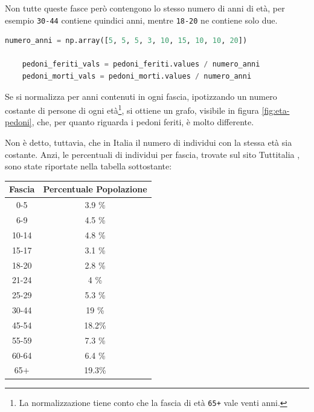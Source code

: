 \documentclass[a4paper]{report}
\newcommand{\columnstyle}[1]{\texttt{#1}}
\begin{document}
Non tutte queste fasce però contengono lo stesso numero di anni di età, per esempio 
\columnstyle{30-44} contiene quindici anni, mentre \columnstyle{18-20} ne contiene solo due.

\begin{lstlisting}[language=Python]
    numero_anni = np.array([5, 5, 5, 3, 10, 15, 10, 10, 20])

    pedoni_feriti_vals = pedoni_feriti.values / numero_anni
    pedoni_morti_vals = pedoni_morti.values / numero_anni
\end{lstlisting}

Se si normalizza per anni contenuti in ogni fascia, ipotizzando un numero costante di 
persone di ogni età\footnote{La normalizzazione tiene conto che la fascia di età 
\columnstyle{65+} vale venti anni.}, 
si ottiene un grafo, visibile in figura \ref{fig:eta-pedoni}, che, per quanto riguarda 
i pedoni feriti, è molto differente.

Non è detto, tuttavia, che in Italia il numero di individui con la stessa età sia costante.
Anzi, le percentuali di individui per fascia, trovate sul sito Tuttitalia \cite{TUTTITALIA:1}, 
sono state riportate nella tabella sottostante: 

\begin{center}
    \def\arraystretch{1.5}%
    \begin{tabular}{ |c|c| } 
    \hline
    Fascia & Percentuale Popolazione \\ 
    \hline
    \rowcolor{TableGray}
    0-5     & 3.9 \% \\ 
    6-9     & 4.5 \% \\
    \rowcolor{TableGray}
    10-14   & 4.8 \% \\
    15-17   & 3.1 \% \\
    \rowcolor{TableGray}
    18-20   & 2.8 \% \\ 
    21-24   & 4   \% \\
    \rowcolor{TableGray}
    25-29   & 5.3 \% \\
    30-44   & 19  \% \\
    \rowcolor{TableGray}
    45-54   & 18.2\% \\ 
    55-59   & 7.3 \% \\
    \rowcolor{TableGray}
    60-64   & 6.4 \% \\
    65$+$   & 19.3\% \\
    \hline
    \end{tabular}
\end{center}
\end{document}
